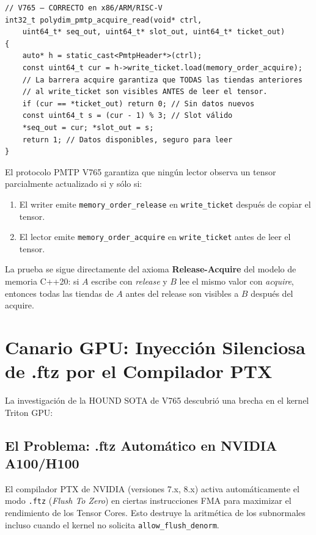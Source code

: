 \begin{verbatim}
// V765 — CORRECTO en x86/ARM/RISC-V
int32_t polydim_pmtp_acquire_read(void* ctrl,
    uint64_t* seq_out, uint64_t* slot_out, uint64_t* ticket_out)
{
    auto* h = static_cast<PmtpHeader*>(ctrl);
    const uint64_t cur = h->write_ticket.load(memory_order_acquire);
    // La barrera acquire garantiza que TODAS las tiendas anteriores
    // al write_ticket son visibles ANTES de leer el tensor.
    if (cur == *ticket_out) return 0; // Sin datos nuevos
    const uint64_t s = (cur - 1) % 3; // Slot válido
    *seq_out = cur; *slot_out = s;
    return 1; // Datos disponibles, seguro para leer
}
\end{verbatim}

\begin{theorem}
El protocolo PMTP V765 garantiza que ningún lector observa un tensor parcialmente
actualizado si y sólo si:
\begin{enumerate}
  \item El writer emite \texttt{memory\_order\_release} en \texttt{write\_ticket} después de copiar el tensor.
  \item El lector emite \texttt{memory\_order\_acquire} en \texttt{write\_ticket} antes de leer el tensor.
\end{enumerate}
La prueba se sigue directamente del axioma \textbf{Release-Acquire} del modelo de memoria C++20:
si $A$ escribe con \emph{release} y $B$ lee el mismo valor con \emph{acquire}, entonces
todas las tiendas de $A$ antes del release son visibles a $B$ después del acquire.
\end{theorem}

\section{Canario GPU: Inyección Silenciosa de .ftz por el Compilador PTX}

La investigación de la HOUND SOTA de V765 descubrió una brecha en el kernel Triton GPU:

\subsection{El Problema: .ftz Automático en NVIDIA A100/H100}

El compilador PTX de NVIDIA (versiones 7.x, 8.x) activa automáticamente el modo
\texttt{.ftz} (\textit{Flush To Zero}) en ciertas instrucciones FMA para maximizar el
rendimiento de los Tensor Cores. Esto destruye la aritmética de los subnormales incluso
cuando el kernel no solicita \texttt{allow\_flush\_denorm}.

